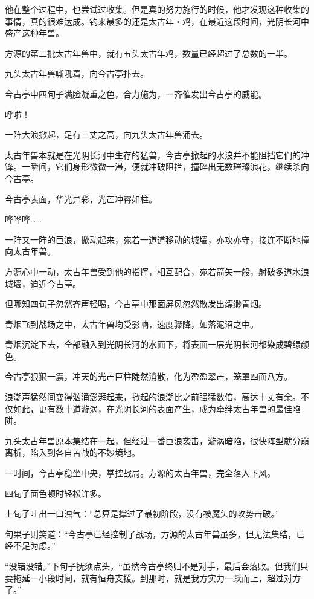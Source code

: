 \begin{this_body}
他在整个过程中，也尝试过收集。但是真的努力施行的时候，他才发现这种收集的事情，真的很难达成。钓来最多的还是太古年・鸡，在最近这段时间，光阴长河中盛产这种年兽。

方源的第二批太古年兽中，就有五头太古年鸡，数量已经超过了总数的一半。

九头太古年兽嘶吼着，向今古亭扑去。

今古亭中四旬子满脸凝重之色，合力施为，一齐催发出今古亭的威能。

呼啦！

一阵大浪掀起，足有三丈之高，向九头太古年兽涌去。

太古年兽本就是在光阴长河中生存的猛兽，今古亭掀起的水浪并不能阻挡它们的冲锋。一瞬间，它们身形微微一滞，便就冲破阻拦，撞碎出无数璀璨浪花，继续杀向今古亭。

今古亭表面，华光异彩，光芒冲霄如柱。

哗哗哗……

一阵又一阵的巨浪，掀动起来，宛若一道道移动的城墙，亦攻亦守，接连不断地撞向太古年兽。

方源心中一动，太古年兽受到他的指挥，相互配合，宛若箭矢一般，射破多道水浪城墙，迫近今古亭。

但哪知四旬子忽然齐声轻喝，今古亭中那面屏风忽然散发出缥缈青烟。

青烟飞到战场之中，太古年兽均受影响，速度骤降，如落泥沼之中。

青烟沉淀下去，全部融入到光阴长河的水面下，将表面一层光阴长河都染成碧绿颜色。

今古亭狠狠一震，冲天的光芒巨柱陡然消散，化为盈盈翠芒，笼罩四面八方。

浪潮声猛然间变得汹涌澎湃起来，掀起的浪潮比之前强猛数倍，高达十丈有余。不仅如此，更有数十道漩涡，在光阴长河的表面产生，成为牵绊太古年兽的最佳陷阱。

九头太古年兽原本集结在一起，但经过一番巨浪袭击，漩涡暗陷，很快阵型就分崩离析，陷入到各自苦战的不妙境地。

一时间，今古亭稳坐中央，掌控战局。方源的太古年兽，完全落入下风。

四旬子面色顿时轻松许多。

上旬子吐出一口浊气：“总算是撑过了最初阶段，没有被魔头的攻势击破。”

旬果子则笑道：“今古亭已经控制了战场，方源的太古年兽虽多，但无法集结，已经不足为虑。”

“没错没错。”下旬子抚须点头，“虽然今古亭终归不是对手，最后会落败。但我们只要拖延一小段时间，就有恒舟支援。到那时，就是我方实力一跃而上，超过对方了。”


\end{this_body}
